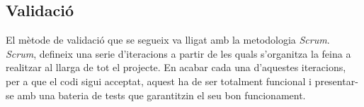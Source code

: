 \subsection{Validació}
El mètode de validació que se segueix va lligat amb la metodologia \textit{Scrum}.\\
\textit{Scrum}, defineix una serie d'iteracions a partir de les quals s'organitza la feina a realitzar al llarga de tot el projecte. En acabar cada una d'aquestes iteracions, per a que el codi sigui acceptat,  aquest ha de ser totalment funcional i presentar-se amb una bateria de tests que garantitzin el seu bon funcionament.

















